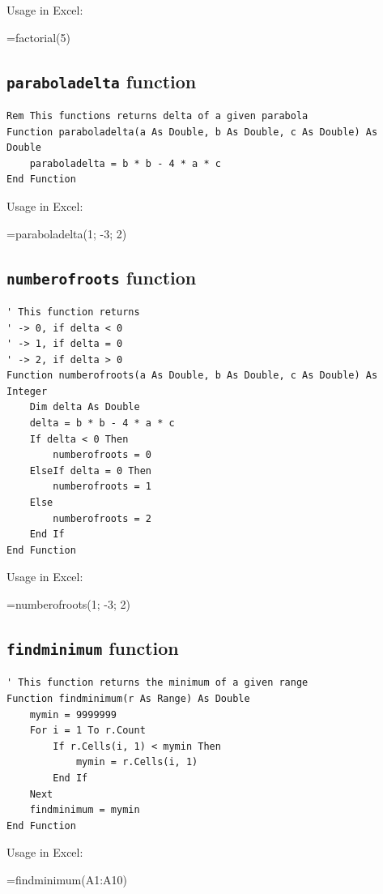 \documentclass{article}
\begin{document}
Usage in Excel:

\begin{tcolorbox}
=factorial(5)
\end{tcolorbox}



\subsection{\texttt{paraboladelta} function}
\begin{verbatim}
Rem This functions returns delta of a given parabola
Function paraboladelta(a As Double, b As Double, c As Double) As Double
    paraboladelta = b * b - 4 * a * c
End Function
\end{verbatim}

Usage in Excel:
\begin{tcolorbox}
=paraboladelta(1; -3; 2)
\end{tcolorbox}


\subsection{\texttt{numberofroots} function}
\begin{verbatim}
' This function returns
' -> 0, if delta < 0
' -> 1, if delta = 0
' -> 2, if delta > 0
Function numberofroots(a As Double, b As Double, c As Double) As Integer
    Dim delta As Double
    delta = b * b - 4 * a * c
    If delta < 0 Then
        numberofroots = 0
    ElseIf delta = 0 Then
        numberofroots = 1
    Else
        numberofroots = 2
    End If
End Function
\end{verbatim}

Usage in Excel:

\begin{tcolorbox}
=numberofroots(1; -3; 2)
\end{tcolorbox}



\subsection{\texttt{findminimum} function}
\begin{verbatim}
' This function returns the minimum of a given range
Function findminimum(r As Range) As Double
    mymin = 9999999
    For i = 1 To r.Count
        If r.Cells(i, 1) < mymin Then
            mymin = r.Cells(i, 1)
        End If
    Next
    findminimum = mymin
End Function
\end{verbatim}

Usage in Excel:

\begin{tcolorbox}
=findminimum(A1:A10)
\end{tcolorbox}




\end{document}
